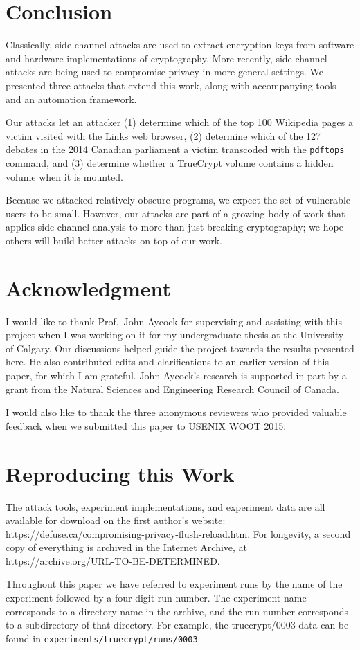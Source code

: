 \documentclass[letterpaper,twocolumn,10pt]{article}
\begin{document}
\section{Conclusion}
\label{sec:conclusion}

Classically, side channel attacks are used to extract encryption keys from
software and hardware implementations of cryptography. More recently, side
channel attacks are being used to compromise privacy in more general settings.
We presented three attacks that extend this work, along with accompanying tools
and an automation framework.

Our attacks let an attacker (1) determine which of the top 100 Wikipedia pages
a victim visited with the Links web browser, (2) determine which of the 127
debates in the 2014 Canadian parliament a victim transcoded with the
\texttt{pdftops} command, and (3) determine whether a TrueCrypt volume contains
a hidden volume when it is mounted.

Because we attacked relatively obscure programs, we expect the set of vulnerable
users to be small. However, our attacks are part of a growing body of work that
applies side-channel analysis to more than just breaking cryptography; we hope
others will build better attacks on top of our work.

\section*{Acknowledgment}

I would like to thank Prof.\ John Aycock for supervising and assisting with this
project when I was working on it for my undergraduate thesis at the University
of Calgary. Our discussions helped guide the project towards the results
presented here. He also contributed edits and clarifications to an earlier
version of this paper, for which I am grateful. John Aycock's research is
supported in part by a grant from the Natural Sciences and Engineering Research
Council of Canada.

I would also like to thank the three anonymous reviewers who provided valuable
feedback when we submitted this paper to USENIX WOOT 2015.

{\footnotesize 
}

\appendix
\section{Reproducing this Work}
\label{sec:reproducing}

The attack tools, experiment implementations, and experiment data are all
available for download on the first author's website:
\url{https://defuse.ca/compromising-privacy-flush-reload.htm}.
For longevity, a second copy of everything is archived in the Internet
Archive, at
\url{https://archive.org/URL-TO-BE-DETERMINED}.

Throughout this paper we have referred to experiment runs by the name of the
experiment followed by a four-digit run number. The experiment name
corresponds to a directory name in the archive, and the run number
corresponds to a subdirectory of that directory. For example, the
truecrypt/0003 data can be found in
\texttt{experiments/truecrypt/runs/0003}.
\end{document}
